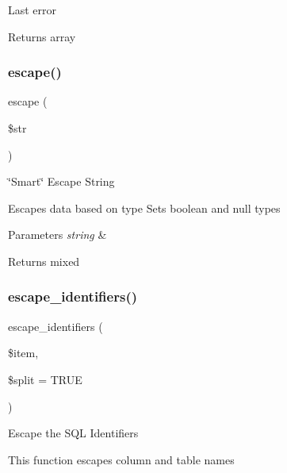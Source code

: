 Last error

\begin{DoxyReturn}{Returns}
array 
\end{DoxyReturn}
\mbox{\label{class_c_i___d_b__driver_ac8f37ca5703d4558c732e692194f8cd6}} 
\subsubsection{\texorpdfstring{escape()}{escape()}}
{\footnotesize\ttfamily escape (\begin{DoxyParamCaption}\item[{}]{\$str }\end{DoxyParamCaption})}

\char`\"{}\+Smart\char`\"{} Escape String

Escapes data based on type Sets boolean and null types


\begin{DoxyParams}{Parameters}
{\em string} & \\
\hline
\end{DoxyParams}
\begin{DoxyReturn}{Returns}
mixed 
\end{DoxyReturn}
\mbox{\label{class_c_i___d_b__driver_ac4962ebf229973bede312dfd187bc569}} 
\subsubsection{\texorpdfstring{escape\+\_\+identifiers()}{escape\_identifiers()}}
{\footnotesize\ttfamily escape\+\_\+identifiers (\begin{DoxyParamCaption}\item[{}]{\$item,  }\item[{}]{\$split = {\ttfamily TRUE} }\end{DoxyParamCaption})}

Escape the S\+QL Identifiers

This function escapes column and table names



